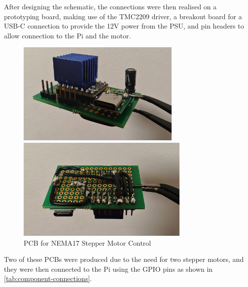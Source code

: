 After designing the schematic, the connections were then realised on a prototyping board, making use of the TMC2209 driver, a breakout board for a USB-C connection to provide the 12V power from the PSU, and pin headers to allow connection to the Pi and the motor.

\begin{figure}[H]
    \hfill
    \begin{minipage}[t]{0.45\textwidth}
      \centering
      \includegraphics[width=\textwidth,height=5cm, keepaspectratio]{imgs/real/tmc2209-0.jpeg}
    \end{minipage}
    \hfill
    \begin{minipage}[t]{0.45\textwidth}
      \centering
      \includegraphics[width=\textwidth,height=5cm, keepaspectratio]{imgs/real/tmc2209-1.jpeg}
    \end{minipage}
    \hfill
    \caption{PCB for NEMA17 Stepper Motor Control}
\end{figure}

Two of these PCBs were produced due to the need for two stepper motors, and they were then connected to the Pi using the GPIO pins as shown in \autoref{tab:component-connections}.